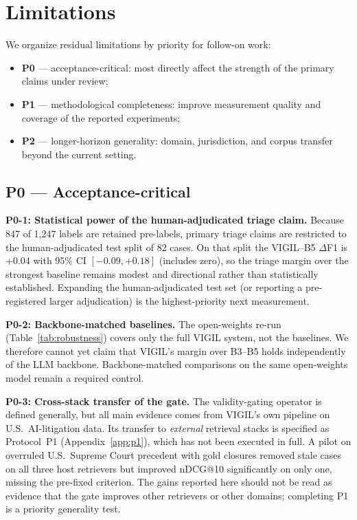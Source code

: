 \section*{Limitations}
\label{sec:limitations}

We organize residual limitations by priority for follow-on work:
\begin{itemize}[leftmargin=1.4em,itemsep=1pt,topsep=2pt]
  \item \textbf{P0} --- acceptance-critical: most directly affect the strength of the primary claims under review;
  \item \textbf{P1} --- methodological completeness: improve measurement quality and coverage of the reported experiments;
  \item \textbf{P2} --- longer-horizon generality: domain, jurisdiction, and corpus transfer beyond the current setting.
\end{itemize}

\subsection*{P0 --- Acceptance-critical}

\textbf{P0-1: Statistical power of the human-adjudicated triage claim.}
Because 847 of 1{,}247 labels are retained pre-labels, primary triage claims are restricted to the human-adjudicated test split of 82 cases. On that split the VIGIL--B5 $\Delta$F1 is ${+}0.04$ with 95\% CI $[{-}0.09,{+}0.18]$ (includes zero), so the triage margin over the strongest baseline remains modest and directional rather than statistically established. Expanding the human-adjudicated test set (or reporting a pre-registered larger adjudication) is the highest-priority next measurement.

\textbf{P0-2: Backbone-matched baselines.}
The open-weights re-run (Table~\ref{tab:robustness}) covers only the full VIGIL system, not the baselines. We therefore cannot yet claim that VIGIL's margin over B3--B5 holds independently of the LLM backbone. Backbone-matched comparisons on the same open-weights model remain a required control.

\textbf{P0-3: Cross-stack transfer of the gate.}
The validity-gating operator is defined generally, but all main evidence comes from VIGIL's own pipeline on U.S.\ AI-litigation data. Its transfer to \emph{external} retrieval stacks is specified as Protocol~P1 (Appendix~\ref{app:p1}), which has not been executed in full. A pilot on overruled U.S.\ Supreme Court precedent with gold closures removed stale cases on all three host retrievers but improved nDCG@10 significantly on only one, missing the pre-fixed criterion. The gains reported here should not be read as evidence that the gate improves other retrievers or other domains; completing P1 is a priority generality test.

